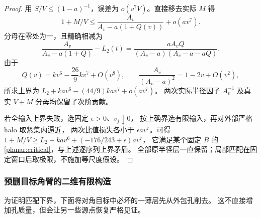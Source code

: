 \begin{proof}
用 \(S/V\le(1-a)^{-1}\)，误差为 \(o(v^7V)\)。直接移去实际 \(M\) 得
\[
 1+M/V\le\frac{A_v}{A_v-a(1+Q(v))}+o(av^7).
\]
分母在零处为一，且精确相减为
\[
 \frac{A_v}{A_v-a(1+Q)}-L_2(t)
 =\frac{aA_vQ}{(A_v-a)(A_v-a-aQ)}.
\]
由于
\[
 Q(v)=kv^6-\frac{26}{9}kv^7+O(v^8),\qquad
 \frac{A_v}{(A_v-a)^2}=1-2v+O(v^2),
\]
所求上界为 \(L_2+kav^6-(44/9)kav^7+o(av^7)\)。
两次实际半径因子 \(A_v^{-1}\) 及真实 \(V+M\) 分母均保留了次阶贡献。

若全输入上界失败，选固定 \(\epsilon>0\)、\(v_j\downarrow0\)，
按上确界选有限输入，再对外部严格 halo 取紧集内逼近，
两次比值损失各小于 \(\epsilon av^7\)。可得
\(1+M/V\ge L_2+kav^6+(-176/243+\epsilon)av^7\)，
它满足某个固定 \(B\) 的 \eqref{planar:critical}，与上述逐序列上界矛盾。
全部原半径层一直保留；局部匹配在固定窗口后取极限，不施加等尺度假设。
\end{proof}

\subsubsection{预删目标角臂的二维有限构造}

为证明匹配下界，下面将对角目标中必坏的一薄层先从外包孔削去。
这不直接增加孔质量，但会让另一些源点恢复严格见证。

